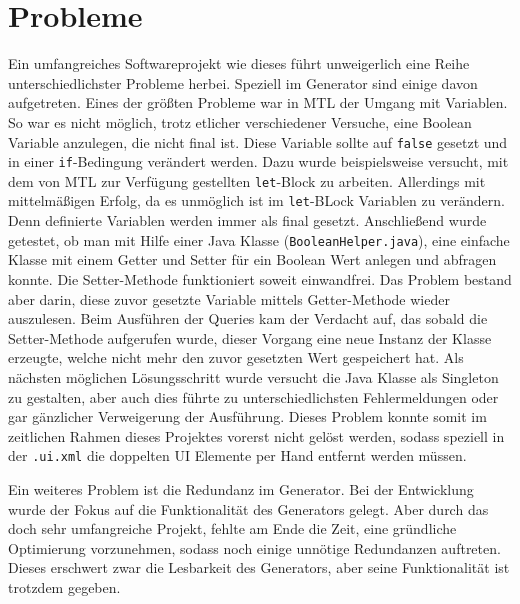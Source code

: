 \section{Probleme} \label{Probleme}
Ein umfangreiches Softwareprojekt wie dieses führt unweigerlich eine Reihe unterschiedlichster Probleme herbei. Speziell im Generator sind einige davon aufgetreten.
Eines der größten Probleme war in MTL der Umgang mit Variablen. So war es nicht möglich, trotz etlicher verschiedener Versuche, eine Boolean Variable anzulegen, die nicht final ist. Diese Variable sollte auf \texttt{false} gesetzt und in einer \texttt{if}-Bedingung verändert werden. 
Dazu wurde beispielsweise versucht, mit dem von MTL zur Verfügung gestellten \texttt{let}-Block zu arbeiten. Allerdings mit mittelmäßigen Erfolg, da es unmöglich ist im \texttt{let}-BLock Variablen zu verändern. Denn definierte Variablen werden immer als final gesetzt. Anschließend wurde getestet, ob man mit Hilfe einer Java Klasse (\texttt{BooleanHelper.java}), eine einfache Klasse mit einem Getter und Setter für ein Boolean Wert anlegen und abfragen konnte. Die Setter-Methode funktioniert soweit einwandfrei. Das Problem bestand aber darin, diese zuvor gesetzte Variable mittels Getter-Methode wieder auszulesen. Beim Ausführen der Queries kam der Verdacht auf, das sobald die Setter-Methode aufgerufen wurde, dieser Vorgang eine neue Instanz der Klasse erzeugte, welche nicht mehr den zuvor gesetzten Wert gespeichert hat. Als nächsten möglichen Lösungsschritt wurde versucht die Java Klasse als Singleton zu gestalten, aber auch dies führte zu unterschiedlichsten Fehlermeldungen oder gar gänzlicher Verweigerung der Ausführung. 
Dieses Problem konnte somit im zeitlichen Rahmen dieses Projektes vorerst nicht gelöst werden, sodass speziell in der \texttt{.ui.xml} die doppelten UI Elemente per Hand entfernt werden müssen.
 
Ein weiteres Problem ist die Redundanz im Generator. Bei der Entwicklung wurde der Fokus auf die Funktionalität des Generators gelegt. Aber durch das doch sehr umfangreiche Projekt, fehlte am Ende die Zeit, eine gründliche Optimierung vorzunehmen, sodass noch einige unnötige Redundanzen auftreten. Dieses erschwert zwar die Lesbarkeit des Generators, aber seine Funktionalität ist trotzdem gegeben.